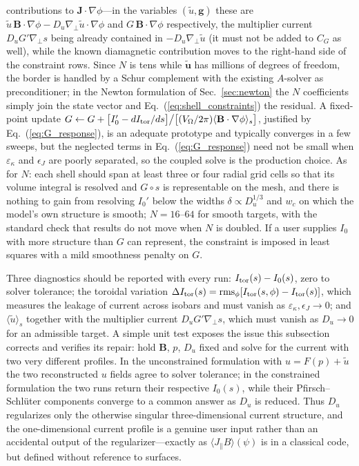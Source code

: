 \documentclass[english]{article}
\newcommand{\bB}{\mathbf{B}}
\newcommand{\bJ}{\mathbf{J}}
\newcommand{\gradperp}{\nabla_{\!\perp}}
\begin{document}
contributions to $\bJ\cdot\nabla\phi$---in the variables $(\tilde u,\mathbf g)$ these are
$\tilde u\,\bB\cdot\nabla\phi-D_u\gradperp\tilde u\cdot\nabla\phi$ and $G\,\bB\cdot\nabla\phi$
respectively, the multiplier current $D_uG'\gradperp s$ being already contained in
$-D_u\gradperp\tilde u$ (it must not be added to $C_G$ as well), while the known diamagnetic
contribution moves to the right-hand side of the constraint rows. Since $N$ is tens while $\tilde{\mathbf u}$ has millions of
degrees of freedom, the border is handled by a Schur complement with the existing $A$-solver as
preconditioner; in the Newton formulation of Sec.~\ref{sec:newton} the $N$ coefficients simply
join the state vector and Eq.~(\ref{eq:shell_constraints}) the residual. A fixed-point update
$G\leftarrow G+\big[I_0'-dI_{\rm tor}/ds\big]\big/\big[(V_\Omega/2\pi)\langle\bB\cdot\nabla\phi\rangle_s\big]$,
justified by Eq.~(\ref{eq:G_response}), is an adequate prototype and typically converges in a few
sweeps, but the neglected terms in Eq.~(\ref{eq:G_response}) need not be small when
$\varepsilon_\kappa$ and $\epsilon_J$ are poorly separated, so the coupled solve is the production
choice. As for $N$: each shell should span at least three or four radial grid cells so that its
volume integral is resolved and $G\circ s$ is representable on the mesh, and there is nothing to
gain from resolving $I_0'$ below the widths $\delta\propto D_u^{1/3}$ and $w_c$ on which the
model's own structure is smooth; $N=16$--$64$ for smooth targets, with the standard check that
results do not move when $N$ is doubled. If a user supplies $I_0$ with more structure than $G$ can
represent, the constraint is imposed in least squares with a mild smoothness penalty on $G$.

Three diagnostics should be reported with every run: $I_{\rm tor}(s)-I_0(s)$, zero to solver
tolerance; the toroidal variation $\Delta I_{\rm tor}(s)={\rm rms}_\phi[I_{\rm tor}(s,\phi)
-I_{\rm tor}(s)]$, which measures the leakage of current across isobars and must vanish as
$\varepsilon_\kappa,\epsilon_J\rightarrow0$; and $\langle\tilde u\rangle_s$ together with the
multiplier current $D_uG'\gradperp s$, which must vanish as $D_u\rightarrow0$ for an admissible
target. A simple unit test exposes the issue this subsection corrects and verifies its repair: hold
$\bB$, $p$, $D_u$ fixed and solve for the current with two very different profiles. In the
unconstrained formulation with $u=F(p)+\tilde u$ the two reconstructed $u$ fields agree to solver
tolerance; in the constrained formulation the two runs return their respective $I_0(s)$, while
their Pfirsch--Schl\"uter components converge to a common answer as $D_u$ is reduced. Thus $D_u$
regularizes only the otherwise singular three-dimensional current structure, and the
one-dimensional current profile is a genuine user input rather than an accidental output of the
regularizer---exactly as $\langle J_\parallel B\rangle(\psi)$ is in a classical code, but defined
without reference to surfaces.
\end{document}
